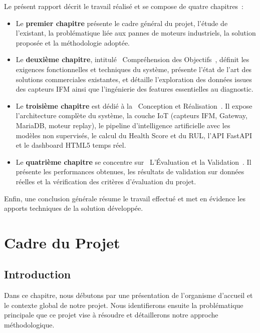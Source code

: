 \documentclass[12pt,a4paper]{report}
\begin{document}
Le présent rapport décrit le travail réalisé et se compose de quatre chapitres~:

\begin{itemize}
  \item Le \textbf{premier chapitre} présente le cadre général du
  projet, l'étude de l'existant, la problématique liée aux pannes de
  moteurs industriels, la solution proposée et la méthodologie
  adoptée.

  \item Le \textbf{deuxième chapitre}, intitulé
  \og~Compréhension des Objectifs~\fg{}, définit les exigences
  fonctionnelles et techniques du système, présente l'état de l'art
  des solutions commerciales existantes, et détaille l'exploration des
  données issues des capteurs IFM ainsi que l'ingénierie des
  features essentielles au diagnostic.

  \item Le \textbf{troisième chapitre} est dédié à la
  \og~Conception et Réalisation~\fg{}. Il expose l'architecture
  complète du système, la couche IoT (capteurs IFM, Gateway, MariaDB,
  moteur replay), le pipeline d'intelligence artificielle
  avec les modèles non supervisés, le calcul du Health Score
  et du RUL, l'API FastAPI et le dashboard HTML5 temps réel.

  \item Le \textbf{quatrième chapitre} se concentre sur
  \og~L'Évaluation et la Validation~\fg{}. Il présente les
  performances obtenues, les résultats de validation sur données
  réelles et la vérification des critères d'évaluation du projet.
\end{itemize}

Enfin, une conclusion générale résume le travail effectué et met en
évidence les apports techniques de la solution développée.

\chapter{Cadre du Projet}

\section{Introduction}

Dans ce chapitre, nous débutons par une présentation de l'organisme d'accueil et le
contexte global de notre projet. Nous identifierons ensuite la problématique principale
que ce projet vise à résoudre et détaillerons notre approche méthodologique.
\end{document}
